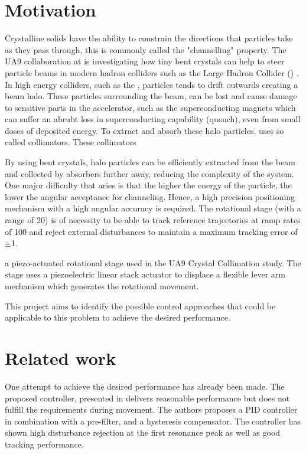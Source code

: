 \section{Motivation}
Crystalline solids have the ability to constrain the directions that particles take as they pass through, this is commonly called the "channelling" property. The UA9 collaboration at \abbrCERN is investigating how tiny bent crystals can help to steer particle beams in modern hadron colliders such as the Large Hadron Collider (\abbrLHC) \citep{WebsiteUA9:2016}. In high energy colliders, such as the \abbrLHC, particles tends to drift outwards creating a beam halo. These particles surrounding the beam, can be lost and cause damage to sensitive parts in the accelerator, such as the superconducting magnets which can suffer an abrubt loss in superconducting capability (quench), even from small doses of deposited energy. To extract and absorb these halo particles, \abbrCERN uses so called collimators. These collimators

 By using bent crystals, halo particles can be efficiently extracted from the beam and collected by absorbers further away, reducing the complexity of the system. One major difficulty that aries is that the higher the energy of the particle, the lower the angular acceptance for channeling. Hence, a high precision positioning mechanism with a high angular accuracy is required. The rotational stage (with a range of \unit{20}{\milli\rad}) is of necessity to be able to track reference trajectories at ramp rates of \unit{100}{\micro\radianpersecond} and reject external disturbances to maintain a maximum tracking error of $\pm$\unit{1}{\micro\rad}.

a piezo-actuated rotational stage used in the UA9 Crystal Collimation study. The stage uses a piezoelectric linear stack actuator to displace a flexible lever arm mechanism which generates the rotational movement.

This project aims to identify the possible control approaches that could be applicable to this problem to achieve the desired performance.

\section{Related work}
One attempt to achieve the desired performance has already been made. The proposed controller, presented in \citep{ButcherController:2015} delivers reasonable performance but does not fulfill the requirements during movement. The authors proposes a PID controller in combination with a pre-filter, and a hysteresis compensator. The controller has shown high disturbance rejection at the first resonance peak as well as good tracking performance.


